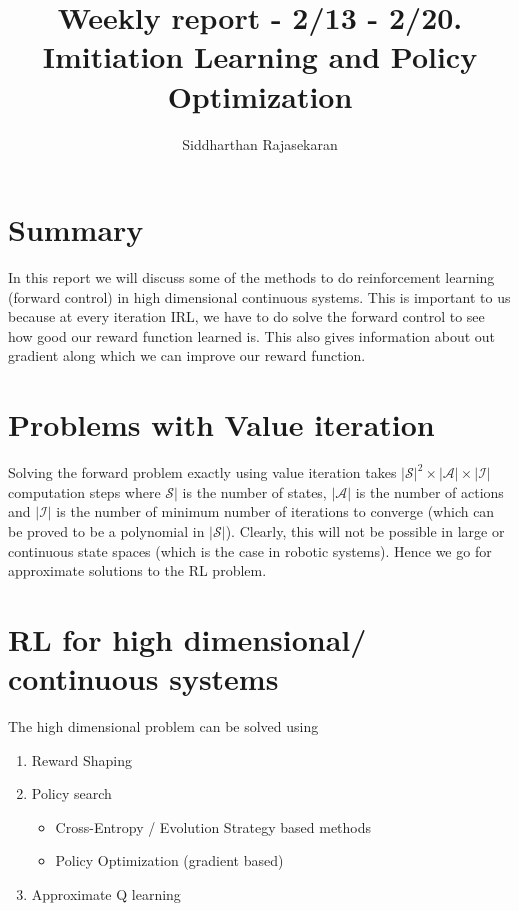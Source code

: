 \documentclass[11pt]{article}
\title{\large \textbf{Weekly report - 2/13 - 2/20. Imitiation Learning and Policy Optimization}}
\author{Siddharthan Rajasekaran}
\date{}
\begin{document}
\maketitle

\section{Summary}
In this report we will discuss some of the methods to do reinforcement learning (forward control) in high dimensional continuous systems. This is important to us because at every iteration IRL, we have to do solve the forward control to see how good our reward function learned is. This also gives information about out gradient along which we can improve our reward function.

\section{Problems with Value iteration}
Solving the forward problem exactly using value iteration takes $|\mathcal{S}|^2\times |\mathcal{A}|\times |\mathcal{I}|$ computation steps where $\mathcal{S}|$ is the number of states, $|\mathcal{A}|$ is the number of actions and $|\mathcal{I}|$ is the number of minimum number of iterations to converge (which can be proved to be a polynomial in $|\mathcal{S}|$). Clearly, this will not be possible in large or continuous state spaces (which is the case in robotic systems). Hence we go for approximate solutions to the RL problem.

\section{RL for high dimensional/ continuous systems}
The high dimensional problem can be solved using 
\begin{enumerate}
\item Reward Shaping \cite{ng2003shaping}
\item Policy search
\begin{itemize}
\item Cross-Entropy / Evolution Strategy based methods \cite{hansen1996adapting, theodorou2010generalized, kober2009policy, Salimans2017Evolution}
\item Policy Optimization (gradient based) \cite{baxter2001infinite, schulman2015trust}
\end{itemize}
\item Approximate Q learning \cite{van2016deep}
\end{enumerate}
\end{document}
